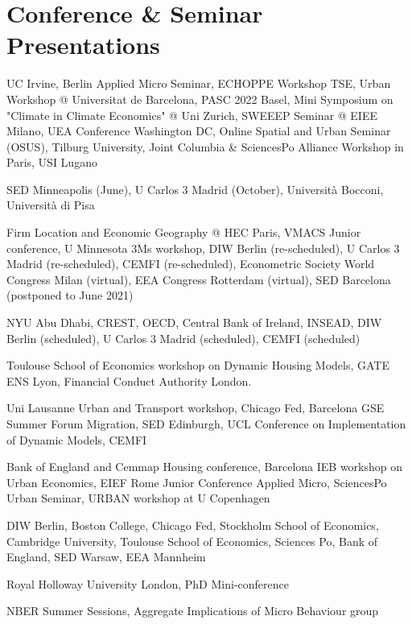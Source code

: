 \documentclass[letterpaper]{article}
\renewenvironment{itemize}{
  \begin{list}{}{
    \setlength{\leftmargin}{1.5em}
  }
}{
  \end{list}
}
\begin{document}
\section*{Conference \& Seminar Presentations}

\begin{itemize}
\item[2022:] UC Irvine, Berlin Applied Micro Seminar, ECHOPPE Workshop TSE, Urban Workshop @ Universitat de Barcelona, PASC 2022 Basel, Mini Symposium on "Climate in Climate Economics" @ Uni Zurich, SWEEEP Seminar @ EIEE Milano, UEA Conference Washington DC, Online Spatial and Urban Seminar (OSUS), Tilburg University, Joint Columbia \& SciencesPo Alliance Workshop in Paris, USI Lugano    
\item[2021:] SED Minneapolis (June), U Carlos 3 Madrid (October), Università Bocconi, Università di Pisa
\item[2020:] Firm Location and Economic Geography @ HEC Paris, VMACS Junior conference, U Minnesota 3Ms workshop, DIW Berlin (re-scheduled), U Carlos 3 Madrid (re-scheduled), CEMFI (re-scheduled), Econometric Society World Congress Milan (virtual), EEA Congress Rotterdam (virtual), SED Barcelona (postponed to June 2021)
\item[2019:] NYU Abu Dhabi, CREST, OECD, Central Bank of Ireland, INSEAD, DIW Berlin (scheduled), U Carlos 3 Madrid (scheduled), CEMFI (scheduled)
\item[2018:] Toulouse School of Economics workshop on Dynamic Housing Models, GATE ENS Lyon, Financial Conduct Authority London.
\item[2017:] Uni Lausanne Urban and Transport workshop, Chicago Fed, Barcelona GSE Summer Forum Migration, SED Edinburgh, UCL Conference on Implementation of Dynamic Models, CEMFI
\item[2016:] Bank of England and Cemmap Housing conference, Barcelona IEB workshop on Urban Economics, EIEF Rome Junior Conference Applied Micro, SciencesPo Urban Seminar, URBAN workshop at U Copenhagen
\item[2015:] DIW Berlin, Boston College, Chicago Fed, Stockholm School of Economics, Cambridge University, Toulouse School of Economics, Sciences Po, Bank of England, SED Warsaw, EEA Mannheim
\item[2014:] Royal Holloway University London, PhD Mini-conference
\item[2013:] NBER Summer Sessions, Aggregate Implications of Micro Behaviour group
\end{itemize}
\end{document}
